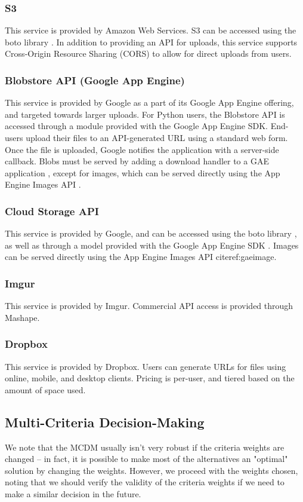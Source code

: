 \documentclass[se]{uw-wkrpt}
\begin{document}
\subsubsection{S3}
This service is provided by Amazon Web Services. S3 can be accessed using the 
boto library \cite{ref:botoreadme}. In addition to providing an API for 
uploads, this service supports Cross-Origin Resource Sharing (CORS) to allow 
for direct uploads from users\cite{ref:s3cors}.

\subsubsection{Blobstore API (Google App Engine)}
This service is provided by Google as a part of its Google App Engine offering, 
and targeted towards larger uploads.  For Python users, the Blobstore API is 
accessed through a module provided with the Google App Engine SDK. End-users 
upload their files to an API-generated URL using a standard web form. Once the 
file is uploaded, Google notifies the application with a server-side callback.  
Blobs must be served by adding a download handler to a GAE application 
\cite{ref:gaeblob}, except for images, which can be served directly using the 
App Engine Images API \cite{ref:gaeimage}.

\subsubsection{Cloud Storage API}
This service is provided by Google, and can be accessed using the boto library 
\cite{ref:botoreadme}, as well as through a model provided with the Google App 
Engine SDK \cite{ref:gaecs}. Images can be served directly using the App Engine 
Images API cite{ref:gaeimage}.

\subsubsection{Imgur}
This service is provided by Imgur. Commercial API access is provided through 
Mashape.

\subsubsection{Dropbox}
This service is provided by Dropbox. Users can generate URLs for files using 
online, mobile, and desktop clients. Pricing is per-user, and tiered based on 
the amount of space used.

\subsection{Multi-Criteria Decision-Making}
We note that the MCDM usually isn't very robust if the criteria weights are 
changed -- in fact, it is possible to make most of the alternatives an 
"optimal" solution by changing the weights. However, we proceed with the 
weights chosen, noting that we should verify the validity of the criteria 
weights if we need to make a similar decision in the future.
\end{document}
